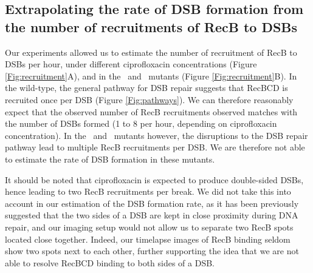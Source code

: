 \subsection*{Extrapolating the rate of DSB formation from the number of recruitments of RecB to DSBs}
Our experiments allowed us to estimate the number of recruitment of RecB to DSBs per hour, under different ciprofloxacin concentrations (Figure \ref{Fig:recruitment}A), and in the \dreca\ and \geneteneighty\ mutants (Figure \ref{Fig:recruitment}B). In the wild-type, the general pathway for DSB repair suggests that RecBCD is recruited once per DSB (Figure \ref{Fig:pathways}). We can therefore reasonably expect that the observed number of RecB recruitments observed matches with the number of DSBs formed (1 to 8 per hour, depending on ciprofloxacin concentration). In the \dreca\ and \geneteneighty\ mutants however, the disruptions to the DSB repair pathway lead to multiple RecB recruitments per DSB. We are therefore not able to estimate the rate of DSB formation in these mutants.

It should be noted that ciprofloxacin is expected to produce double-sided DSBs, hence leading to two RecB recruitments per break. We did not take this into account in our estimation of the DSB formation rate, as it has been previously suggested that the two sides of a DSB are kept in close proximity during DNA repair\cite{Vickridge2017,Keyamura2019}, and our imaging setup would not allow us to separate two RecB spots located close together. Indeed, our timelapse images of RecB binding seldom show two spots next to each other, further supporting the idea that we are not able to resolve RecBCD binding to both sides of a DSB.

